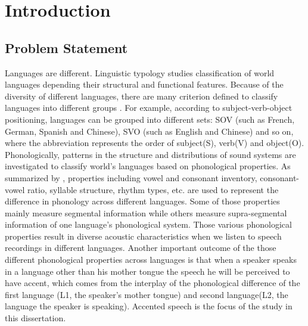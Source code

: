 \chapter{Introduction}
\label{introduction}

\section{Problem Statement}
Languages are different. Linguistic typology studies classification of world languages depending their structural and functional features. Because of the diversity of different languages, there are many criterion defined to classify languages into different groups \citep{wals}. For example, according to subject-verb-object positioning, languages can be grouped into different sets: SOV (such as French, German, Spanish and Chinese), SVO (such as English and Chinese) and so on, where the abbreviation represents the order of subject(S), verb(V) and object(O). Phonologically, patterns in the structure and distributions of sound systems are investigated to classify world's languages based on phonological properties. As summarized by \citep{wals}, properties including vowel and consonant inventory, consonant-vowel ratio, syllable structure, rhythm types, etc. are used to represent the difference in phonology across different languages. Some of those properties mainly measure segmental information while others measure supra-segmental information of one language's phonological system. Those various phonological properties result in diverse acoustic characteristics when we listen to speech recordings in different languages. Another important outcome of the those different phonological properties across languages is that when a speaker speaks in a language other than his mother tongue the speech he will be perceived to have accent, which comes from the interplay of the phonological difference of the first language (L1, the speaker's mother tongue) and second language(L2, the language the speaker is speaking). Accented speech is the focus of the study in this dissertation.

